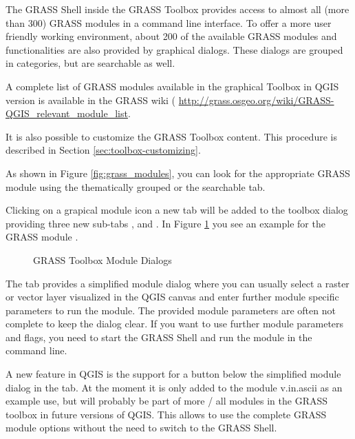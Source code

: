 The GRASS Shell inside the GRASS Toolbox provides access to almost all (more
than 300) GRASS modules in a command line interface. To offer a more user
friendly working environment, about 200 of the available GRASS modules and
functionalities are also provided by graphical dialogs. These dialogs are
grouped in categories, but are searchable as well. 

A complete list of GRASS modules available in the graphical Toolbox in QGIS version \CURRENT
is available in the GRASS wiki ( \url{http://grass.osgeo.org/wiki/GRASS-QGIS_relevant_module_list}. 

It is also possible to customize the GRASS Toolbox content. This procedure is described in Section
\ref{sec:toolbox-customizing}.

As shown in Figure \ref{fig:grass_modules}, you can look for the appropriate
GRASS module using the thematically grouped  or the
searchable  tab.

Clicking on a grapical module icon a new tab will be added to the toolbox
dialog providing three new sub-tabs ,  and
. In Figure \ref{fig:grass_module_dialog} you see an example
for the GRASS module .

\begin{figure}[h]
\centering
   \hspace{1cm}
   \hspace{1cm}
\caption{GRASS Toolbox Module Dialogs \nixcaption}\label{fig:grass_module_dialog}
\end{figure}
\FloatBarrier
{}

The  tab provides a simplified module dialog where you can
usually select a raster or vector layer visualized in the QGIS canvas and
enter further module specific parameters to run the module. The provided
module parameters are often not complete to keep the dialog clear. If you want
to use further module parameters and flags, you need to start the GRASS Shell
and run the module in the command line.

A new feature in QGIS \CURRENT is the support for a
 button below the simplified module dialog
in the  tab. At the moment it is only added to the module v.in.ascii
as an example use, but will probably be part of more / all modules in the
GRASS toolbox in future versions of QGIS. This allows to use the complete GRASS
module options without the need to switch to the GRASS Shell.

